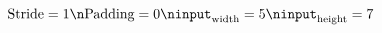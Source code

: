 \documentclass[preview]{standalone}
\begin{document}
\begin{align*}
\text{Stride}=1\n\text{Padding}=0\ninput_{\text{width}}=5\ninput_{\text{height}}=7
\end{align*}
\end{document}
